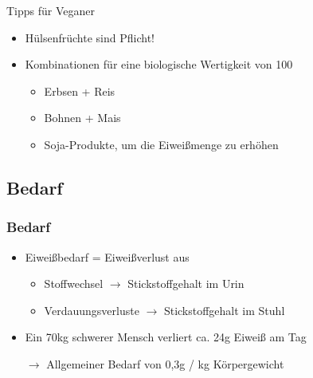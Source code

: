 \documentclass[xcolor=dvipsnames]{beamer}
\begin{document}
\begin{frame}[allowframebreaks]
        \begin{block}{Tipps für Veganer}
            \begin{itemize}
                \setlength\itemsep{1em}
                \item Hülsenfrüchte sind Pflicht!
                \item Kombinationen für eine biologische Wertigkeit von 100
                \begin{itemize}
                    \item Erbsen + Reis
                    \item Bohnen + Mais
                    \item Soja-Produkte, um die Eiweißmenge zu erhöhen
                \end{itemize}
            \end{itemize}
        \end{block}

    \end{frame}

    \subsection{Bedarf}
    \begin{frame}
        \frametitle{Bedarf}

        \begin{itemize}
            \setlength\itemsep{1em}
            \item Eiweißbedarf = Eiweißverlust aus
            \begin{itemize}
                \item Stoffwechsel $\rightarrow$ Stickstoffgehalt im Urin
                \item Verdauungsverluste $\rightarrow$ Stickstoffgehalt im Stuhl
            \end{itemize}
            \item Ein 70kg schwerer Mensch verliert ca. 24g Eiweiß am Tag
            \item[$\rightarrow$] Allgemeiner Bedarf von 0,3g / kg Körpergewicht
        \end{itemize}
    \end{frame}
\end{document}
